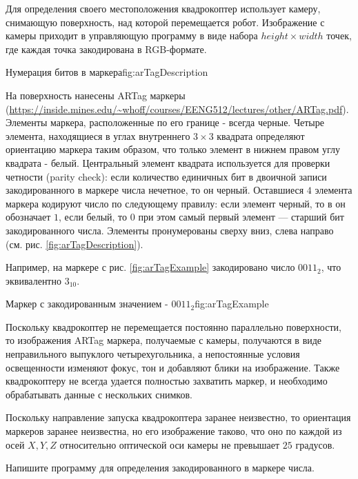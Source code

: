 
Для определения своего местоположения квадрокоптер использует камеру, снимающую поверхность,
над которой перемещается робот. Изображение с камеры приходит в управляющую
программу в виде набора $height \times width$ точек, где каждая точка закодирована в RGB-формате.


{Нумерация битов в маркера}{fig:arTagDescription}

На поверхность нанесены ARTag маркеры (\url{https://inside.mines.edu/~whoff/courses/EENG512/lectures/other/ARTag.pdf}).
Элементы маркера, расположенные по его границе - всегда черные. Четыре элемента,
находящиеся в углах внутреннего $3\times 3$ квадрата определяют ориентацию маркера таким
образом, что только элемент в нижнем правом углу квадрата - белый. Центральный элемент
квадрата используется для проверки четности (parity check): если количество единичных бит в двоичной
записи закодированного в маркере числа нечетное, то он черный. Оставшиеся $4$ элемента маркера
кодируют число по следующему правилу: если элемент черный, то в он обозначает $1$,
если белый, то $0$ при этом самый первый элемент --- старший бит закодированного числа.
Элементы пронумерованы сверху вниз, слева направо (см. рис. \ref{fig:arTagDescription}).

Например, на маркере с рис. \ref{fig:arTagExample} закодировано число $0011_2$, что
эквивалентно $3_{10}$.

{Маркер с закодированным значением - $0011_2$}{fig:arTagExample}

Поскольку квадрокоптер не перемещается постоянно параллельно поверхности, то изображения
ARTag маркера, получаемые с камеры, получаются в виде неправильного выпуклого
четырехугольника, а непостоянные условия освещенности изменяют фокус, тон и добавляют блики на изображение.
Также квадрокоптеру не всегда удается полностью захватить маркер, и необходимо обрабатывать данные с нескольких снимков.


Поскольку направление запуска квадрокоптера заранее неизвестно, то ориентация маркеров
заранее неизвестна, но его изображение таково, что оно по каждой из осей $X, Y, Z$
относительно оптической оси камеры не превышает $25$ градусов.

Напишите программу для определения закодированного в маркере числа.


